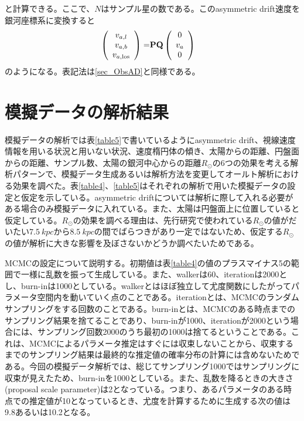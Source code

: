 と計算できる。ここで、$N$はサンプル星の数である。このasymmetric drift速度を銀河座標系に変換すると
\begin{align}
\begin{aligned}
	\left(
	\begin{array}{c}
	 	v_{a,l}\\
		v_{a,b}\\
		v_{a,\mathrm{los}}
	\end{array}
	\right)
	=& \bf{P} \bf{Q}
	\left(
	\begin{array}{c}
	 	0\\
		v_a\\
		0
	\end{array}
	\right)
\end{aligned}
\end{align}
のようになる。表記法は\ref{sec_ObsAD}と同様である。


\section{模擬データの解析結果 \label{模擬データの解析結果}}
模擬データの解析では表\ref{table5}で書いているようにasymmetric drift、視線速度情報を用いる状況と用いない状況、速度楕円体の傾き、太陽からの距離、円盤面からの距離、サンプル数、太陽の銀河中心からの距離$R_{\odot}$の6つの効果を考える解析パターンで、模擬データ生成あるいは解析方法を変更してオールト解析における効果を調べた。表\ref{table4}、\ref{table5}はそれぞれの解析で用いた模擬データの設定と仮定を示している。asymmetric driftについては解析に際して入れる必要がある場合のみ模擬データに入れている。また、太陽は円盤面上に位置していると仮定している。$R_{\odot}$の効果を調べる理由は、先行研究で使われている$R_{\odot}$の値がだいたい$\SI{7.5}{kpc}$から$\SI{8.5}{kpc}$の間でばらつきがあり一定ではないため、仮定する$R_{\odot}$の値が解析に大きな影響を及ぼさないかどうか調べたいためである。

MCMCの設定について説明する。初期値は表\ref{table4}の値のプラスマイナス5の範囲で一様に乱数を振って生成している。また、walkerは60、iterationは2000とし、burn-inは1000としている。walkerとはほぼ独立して尤度関数にしたがってパラメータ空間内を動いていく点のことである。iterationとは、MCMCのランダムサンプリングをする回数のことである。burn-inとは、MCMCのある時点までのサンプリング結果を捨てることであり、burn-inが1000、iterationが2000という場合には、サンプリング回数2000のうち最初の1000は捨てるということである。これは、MCMCによるパラメータ推定はすぐには収束しないことから、収束するまでのサンプリング結果は最終的な推定値の確率分布の計算には含めないためである。今回の模擬データ解析では、総じてサンプリング1000ではサンプリングに収束が見えたため、burn-inを1000としている。また、乱数を降るときの大きさ (proposal scale parameter)は2となっている。つまり、あるパラメータのある時点での推定値が10となっているとき、尤度を計算するために生成する次の値は9.8あるいは10.2となる。

